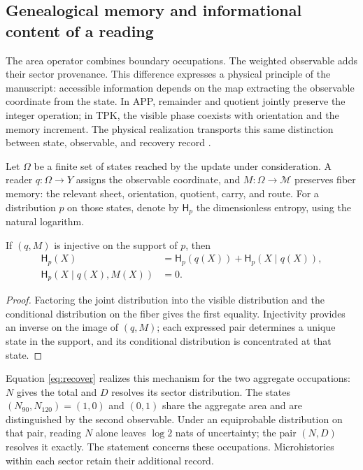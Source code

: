 \subsection{Genealogical memory and informational content of a reading}
\label{sec:ii-memoria-lectura}

The area operator combines boundary occupations. The weighted
observable adds their sector provenance. This difference expresses a
physical principle of the manuscript: accessible information depends on
the map extracting the observable coordinate from the state. In APP, remainder and quotient
jointly preserve the integer operation; in TPK, the visible phase
coexists with orientation and the memory increment. The physical
realization transports this same distinction between state, observable, and
recovery record \cite{informacion}.

Let \(\Omega\) be a finite set of states reached by the
update under consideration. A reader \(q:\Omega\to Y\) assigns the
observable coordinate, and \(M:\Omega\to\mathcal M\) preserves fiber
memory: the relevant sheet, orientation, quotient, carry, and route.
For a distribution \(p\) on those states, denote by
\(\mathsf H_p\) the dimensionless entropy, using the natural logarithm.

\begin{proposition}
If \((q,M)\) is injective on the support of \(p\), then
\begin{align}
 \mathsf H_p(X)&=\mathsf H_p(q(X))+
                 \mathsf H_p(X\mid q(X)),\\
 \mathsf H_p(X\mid q(X),M(X))&=0.
 \label{eq:ii-memoria-condicional}
\end{align}
\end{proposition}
\begin{proof}
Factoring the joint distribution into the visible distribution
and the conditional distribution on the fiber gives the first equality.
Injectivity provides an inverse on the image of \((q,M)\);
each expressed pair determines a unique state in the support, and its
conditional distribution is concentrated at that state.
\end{proof}

Equation \eqref{eq:recover} realizes this mechanism for the two
aggregate occupations: \(N\) gives the total and \(D\) resolves its
sector distribution. The states \((N_{90},N_{120})=(1,0)\) and
\((0,1)\) share the aggregate area and are distinguished by the second
observable. Under an equiprobable distribution on that pair, reading
\(N\) alone leaves \(\log2\) nats of uncertainty;
the pair \((N,D)\) resolves it exactly. The statement concerns
these occupations. Microhistories within each sector retain
their additional record.

